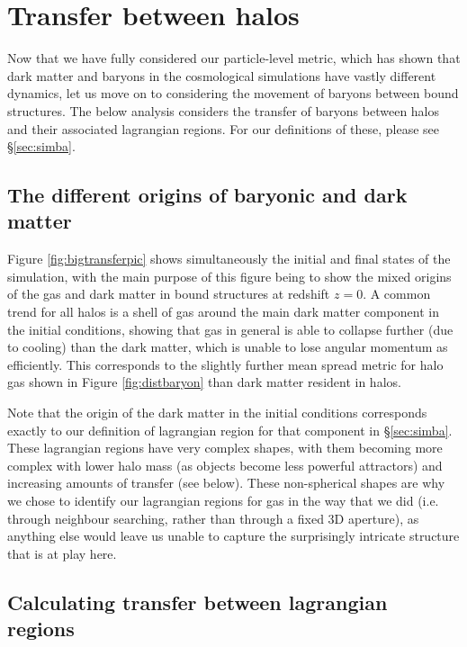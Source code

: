 \section{Transfer between halos}
\label{sec:transfer}

Now that we have fully considered our particle-level metric, which has shown
that dark matter and baryons in the \simba{} cosmological simulations have
vastly different dynamics, let us move on to considering the movement of
baryons between bound structures. The below analysis considers the transfer
of baryons between halos and their associated lagrangian regions. For our
definitions of these, please see \S \ref{sec:simba}.

\subsection{The different origins of baryonic and dark matter}


Figure \ref{fig:bigtransferpic} shows simultaneously the initial and final
states of the simulation, with the main purpose of this figure being to show
the mixed origins of the gas and dark matter in bound structures at redshift $z=0$.
A common trend for all halos is a shell of gas around the main dark matter component
in the initial conditions, showing that gas in general is able to collapse
further (due to cooling) than the dark matter, which is unable to lose angular
momentum as efficiently. This corresponds to the slightly further mean spread metric
for halo gas shown in Figure \ref{fig:distbaryon} than dark matter resident in
halos.

Note that the origin of the dark matter in the initial conditions corresponds
exactly to our definition of lagrangian region for that component in \S \ref{sec:simba}.
These lagrangian regions have very complex shapes, with them becoming more complex with
lower halo mass (as objects become less powerful attractors) and increasing amounts
of transfer (see below). These non-spherical shapes are why we chose to identify
our lagrangian regions for gas in the way that we did (i.e. through neighbour searching,
rather than through a fixed 3D aperture), as anything else would leave us unable to 
capture the surprisingly intricate structure that is at play here.


\subsection{Calculating transfer between lagrangian regions}

